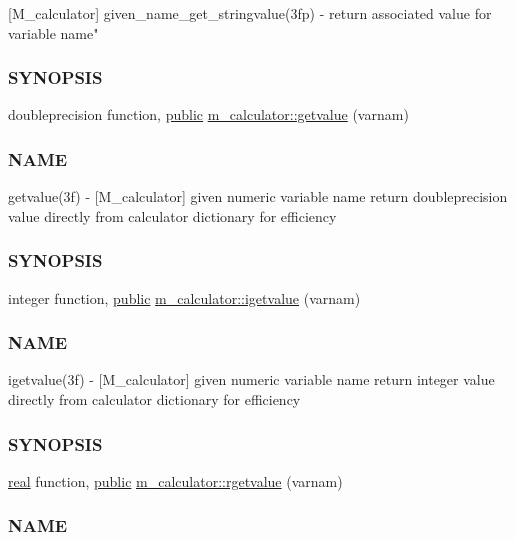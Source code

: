 \begin{DoxyCompactItemize}
\begin{DoxyCompactList}
\mbox{[}M\+\_\+calculator\mbox{]} given\+\_\+name\+\_\+get\+\_\+stringvalue(3fp) -\/ return associated value for variable name" \subsubsection*{S\+Y\+N\+O\+P\+S\+IS}\end{DoxyCompactList}\item 
doubleprecision function, \hyperlink{M__stopwatch_83_8txt_a2f74811300c361e53b430611a7d1769f}{public} \hyperlink{namespacem__calculator_ab8fa4f20b1e4db1b10ed4deb52b89b34}{m\+\_\+calculator\+::getvalue} (varnam)
\begin{DoxyCompactList}\small\item\em \subsubsection*{N\+A\+ME}

getvalue(3f) -\/ \mbox{[}M\+\_\+calculator\mbox{]} given numeric variable name return doubleprecision value directly from calculator dictionary for efficiency \subsubsection*{S\+Y\+N\+O\+P\+S\+IS}\end{DoxyCompactList}\item 
integer function, \hyperlink{M__stopwatch_83_8txt_a2f74811300c361e53b430611a7d1769f}{public} \hyperlink{namespacem__calculator_a192c846b6a8d40ddfe603f988ff82381}{m\+\_\+calculator\+::igetvalue} (varnam)
\begin{DoxyCompactList}\small\item\em \subsubsection*{N\+A\+ME}

igetvalue(3f) -\/ \mbox{[}M\+\_\+calculator\mbox{]} given numeric variable name return integer value directly from calculator dictionary for efficiency \subsubsection*{S\+Y\+N\+O\+P\+S\+IS}\end{DoxyCompactList}\item 
\hyperlink{read__watch_83_8txt_abdb62bde002f38ef75f810d3a905a823}{real} function, \hyperlink{M__stopwatch_83_8txt_a2f74811300c361e53b430611a7d1769f}{public} \hyperlink{namespacem__calculator_af8d4bcc1789a047303ac7061c2a504e8}{m\+\_\+calculator\+::rgetvalue} (varnam)
\begin{DoxyCompactList}\small\item\em \subsubsection*{N\+A\+ME}


\end{DoxyCompactList}
\end{DoxyCompactItemize}
